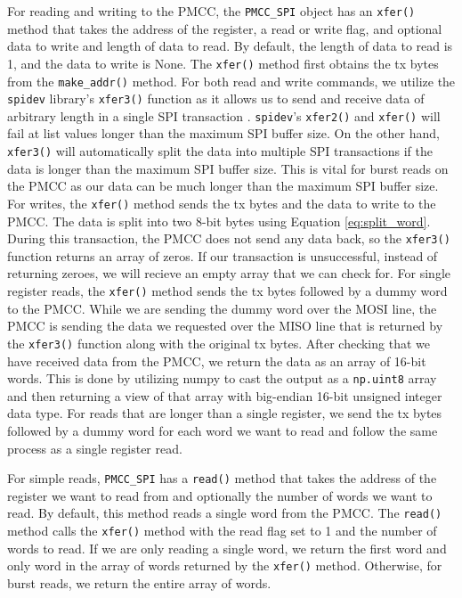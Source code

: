 For reading and writing to the PMCC, the \verb|PMCC_SPI| object has an \verb|xfer()| method that takes the address of the register, a read or write flag, and optional data to write and length of data to read.
By default, the length of data to read is 1, and the data to write is None.
The \verb|xfer()| method first obtains the tx bytes from the \verb|make_addr()| method.
For both read and write commands, we utilize the \verb|spidev| library's \verb|xfer3()| function as it allows us to send and receive data of arbitrary length in a single SPI transaction \cite{spidev}.
\verb|spidev|'s \verb|xfer2()| and \verb|xfer()| will fail at list values longer than the maximum SPI buffer size.
On the other hand, \verb|xfer3()| will automatically split the data into multiple SPI transactions if the data is longer than the maximum SPI buffer size.
This is vital for burst reads on the PMCC as our data can be much longer than the maximum SPI buffer size.
For writes, the \verb|xfer()| method sends the tx bytes and the data to write to the PMCC.
The data is split into two 8-bit bytes using Equation \ref{eq:split_word}.
During this transaction, the PMCC does not send any data back, so the \verb|xfer3()| function returns an array of zeros.
If our transaction is unsuccessful, instead of returning zeroes, we will recieve an empty array that we can check for.
For single register reads, the \verb|xfer()| method sends the tx bytes followed by a dummy word to the PMCC.
While we are sending the dummy word over the MOSI line, the PMCC is sending the data we requested over the MISO line that is returned by the \verb|xfer3()| function along with the original tx bytes.
After checking that we have received data from the PMCC, we return the data as an array of 16-bit words.
This is done by utilizing numpy to cast the output as a \verb|np.uint8| array and then returning a view of that array with big-endian 16-bit unsigned integer data type.
For reads that are longer than a single register, we send the tx bytes followed by a dummy word for each word we want to read and follow the same process as a single register read.

For simple reads, \verb|PMCC_SPI| has a \verb|read()| method that takes the address of the register we want to read from and optionally the number of words we want to read.
By default, this method reads a single word from the PMCC.
The \verb|read()| method calls the \verb|xfer()| method with the read flag set to 1 and the number of words to read.
If we are only reading a single word, we return the first word and only word in the array of words returned by the \verb|xfer()| method. 
Otherwise, for burst reads, we return the entire array of words.

